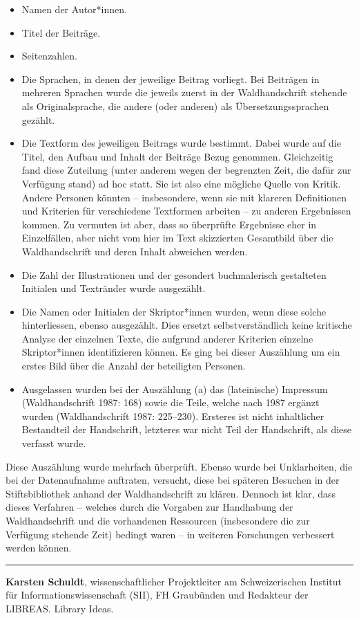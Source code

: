 \documentclass[a4paper,
fontsize=11pt,
oneside,
numbers=noperiodatend,
parskip=half-,
bibliography=totoc,
final
]{scrartcl}
\begin{document}
\begin{itemize}
\item
  Namen der Autor*innen.
\item
  Titel der Beiträge.
\item
  Seitenzahlen.
\item
  Die Sprachen, in denen der jeweilige Beitrag vorliegt. Bei Beiträgen
  in mehreren Sprachen wurde die jeweils zuerst in der Waldhandschrift
  stehende als Originalsprache, die andere (oder anderen) als
  Übersetzungssprachen gezählt.
\item
  Die Textform des jeweiligen Beitrags wurde bestimmt. Dabei wurde auf
  die Titel, den Aufbau und Inhalt der Beiträge Bezug genommen.
  Gleichzeitig fand diese Zuteilung (unter anderem wegen der begrenzten
  Zeit, die dafür zur Verfügung stand) ad hoc statt. Sie ist also eine
  mögliche Quelle von Kritik. Andere Personen könnten -- insbesondere,
  wenn sie mit klareren Definitionen und Kriterien für verschiedene
  Textformen arbeiten -- zu anderen Ergebnissen kommen. Zu vermuten ist
  aber, dass so überprüfte Ergebnisse eher in Einzelfällen, aber nicht
  vom hier im Text skizzierten Gesamtbild über die Waldhandschrift und
  deren Inhalt abweichen werden.
\item
  Die Zahl der Illustrationen und der gesondert buchmalerisch
  gestalteten Initialen und Textränder wurde ausgezählt.
\item
  Die Namen oder Initialen der Skriptor*innen wurden, wenn diese solche
  hinterliessen, ebenso ausgezählt. Dies ersetzt selbstverständlich
  keine kritische Analyse der einzelnen Texte, die aufgrund anderer
  Kriterien einzelne Skriptor*innen identifizieren können. Es ging bei
  dieser Auszählung um ein erstes Bild über die Anzahl der beteiligten
  Personen.
\item
  Ausgelassen wurden bei der Auszählung (a) das (lateinische) Impressum
  (Waldhandschrift 1987: 168) sowie die Teile, welche nach 1987 ergänzt
  wurden (Waldhandschrift 1987: 225--230). Ersteres ist nicht
  inhaltlicher Bestandteil der Handschrift, letzteres war nicht Teil der
  Handschrift, als diese verfasst wurde.
\end{itemize}

Diese Auszählung wurde mehrfach überprüft. Ebenso wurde bei
Unklarheiten, die bei der Datenaufnahme auftraten, versucht, diese bei
späteren Besuchen in der Stiftsbibliothek anhand der Waldhandschrift zu
klären. Dennoch ist klar, dass dieses Verfahren -- welches durch die
Vorgaben zur Handhabung der Waldhandschrift und die vorhandenen
Ressourcen (insbesondere die zur Verfügung stehende Zeit) bedingt waren
-- in weiteren Forschungen verbessert werden können.

\begin{center}\rule{0.5\linewidth}{0.5pt}\end{center}

\textbf{Karsten Schuldt}, wissenschaftlicher Projektleiter am
Schweizerischen Institut für Informationswissenschaft (SII), FH
Graubünden und Redakteur der LIBREAS. Library Ideas.
\end{document}
